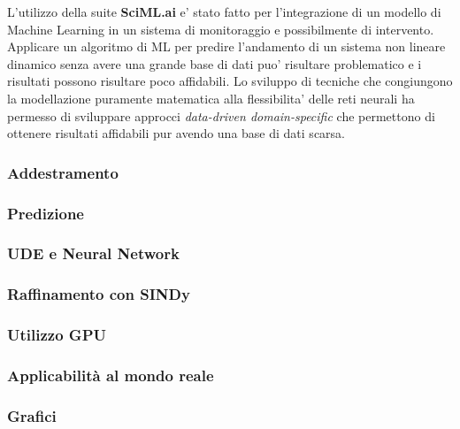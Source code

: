 L'utilizzo della suite \textbf{SciML.ai} e' stato fatto per l'integrazione
di un modello di Machine Learning in un sistema di monitoraggio e possibilmente di 
intervento. Applicare un algoritmo di ML per predire l'andamento di un sistema non lineare dinamico 
senza avere una grande base di dati puo' risultare problematico e i risultati possono risultare 
poco affidabili. Lo sviluppo di tecniche che congiungono la modellazione puramente matematica
alla flessibilita' delle reti neurali ha permesso di sviluppare approcci \emph{data-driven domain-specific} 
\cite{rackauckas2020universal} \cite{Kim_2021} \cite{dandekar2022bayesian} \cite{chen2019neural}
che permettono di ottenere risultati affidabili pur avendo una base di dati scarsa.

\subsubsection*{Addestramento}

\subsubsection*{Predizione}

\subsubsection*{UDE e Neural Network}

\subsubsection*{Raffinamento con SINDy}

\subsubsection*{Utilizzo GPU}

\subsubsection{Applicabilità al mondo reale}

\subsubsection{Grafici}